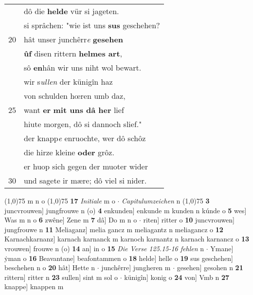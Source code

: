 \documentclass[8pt,a4paper,notitlepage]{article}
\begin{document}
\begin{table}[ht]
\begin{minipage}[t]{0.5\linewidth}
\begin{tabular}{rl}
 & dô die \textbf{helde} vür si jageten.\\ 
 & si sprâchen: "wie ist uns \textbf{sus} geschehen?\\ 
20 & hât unser junchêrr\textit{e} \textbf{gesehen}\\ 
 & \textbf{ûf} disen rittern \textbf{helmes art},\\ 
 & sô \textbf{en}hân wir uns niht wol bewart.\\ 
 & wir s\textit{ullen} der künigîn haz\\ 
 & von schulden hœren umb daz,\\ 
25 & want \textbf{er} \textbf{mit uns dâ her} lief\\ 
 & hiute morgen, dô si dannoch slief."\\ 
 & der knapp\textit{e} enruochte, wer dô schôz\\ 
 & die hirze kleine \textbf{oder} grôz.\\ 
 & er huop sich gegen der muoter wider\\ 
30 & und sagete ir mære; dô viel si nider.\\ 
\end{tabular}
\scriptsize
\line(1,0){75} \newline
m n o \newline
\line(1,0){75} \newline
\textbf{17} \textit{Initiale} m o   $\cdot$ \textit{Capitulumzeichen} n  \newline
\line(1,0){75} \newline
\textbf{3} juncvrouwen] jungfrouwe n (o) \textbf{4} enkunden] enkunde m kunden n kúnde o \textbf{5} wes] Was m n o \textbf{6} zwêne] Zene m \textbf{7} dâ] Do m n o  $\cdot$ riten] ritter o \textbf{10} juncvrouwen] jungfrouwe n \textbf{11} Meliaganz] melia gancz m meliagantz n meliagancz o \textbf{12} Karnachkarnanz] karnach karnanck m karnoch karnantz n karnach karnancz o \textbf{13} vrouwen] frouwe n (o) \textbf{14} an] in o \textbf{15} \textit{Die Verse 125.15-16 fehlen} n   $\cdot$ Ymane] ẏman o \textbf{16} Beavantane] beafontammen o \textbf{18} helde] helle o \textbf{19} sus geschehen] beschehen n o \textbf{20} hât] Hette n  $\cdot$ junchêrre] jungheren m  $\cdot$ gesehen] gesohen n \textbf{21} rittern] ritter n \textbf{23} sullen] sint m sol o  $\cdot$ künigîn] konig o \textbf{24} von] Vmb n \textbf{27} knappe] knappen m \newline
\end{minipage}
\end{table}
\newpage
\end{document}
